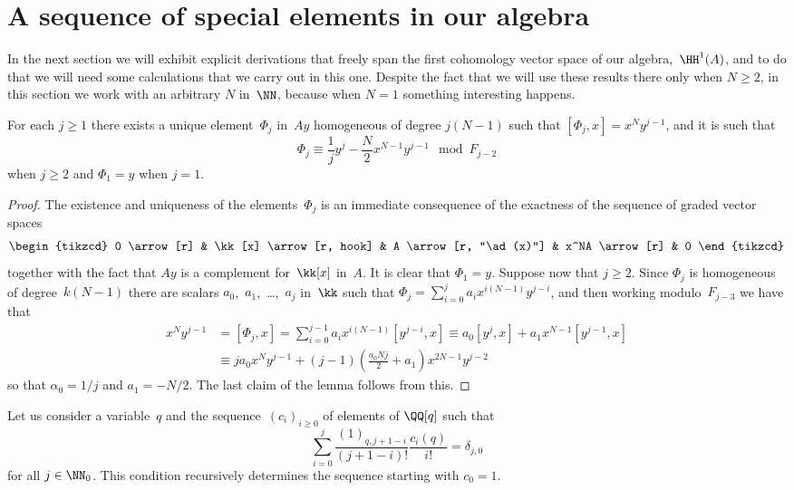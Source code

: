 \section{A sequence of special elements in our algebra}
\label{sect:phi}

In the next section we will exhibit explicit derivations that freely span
the first cohomology vector space of our algebra,~$\HH^1(A)$, and to do
that we will need some calculations that we carry out in this one.
Despite the fact that we will use these results there only when $N\geq2$,
in this section we work with an arbitrary $N$ in~$\NN$, because when $N=1$
something interesting happens.

\begin{Lemma}\label{lemma:phi}
For each $j\geq1$ there exists a unique element~$\Phi_j$ in~$Ay$
homogeneous of degree $j(N-1)$ such that $[\Phi_j,x]=x^Ny^{j-1}$, and it is
such that 
  \[
  \Phi_j\equiv\frac{1}{j}y^{j}-\frac{N}{2}x^{N-1}y^{j-1}\mod F_{j-2}
  \]
when $j\geq2$ and $\Phi_1=y$ when $j=1$.
\end{Lemma}

\begin{proof}
The existence and uniqueness of the elements~$\Phi_j$ is an immediate
consequence of the exactness of the sequence of graded vector spaces
  \[
  \begin{tikzcd}
  0 \arrow[r]
    & \kk[x] \arrow[r, hook]
    & A \arrow[r, "\ad(x)"]
    & x^NA \arrow[r]
    & 0
  \end{tikzcd}
  \]
together with the fact that $Ay$ is a complement for~$\kk[x]$ in~$A$. 
It is clear that $\Phi_1=y$. Suppose now that $j\geq2$.
Since $\Phi_j$ is homogeneous of degree~$k(N-1)$
there are scalars $a_0$,~$a_1$,~\dots,~$a_{j}$ in~$\kk$ such that
$\Phi_j=\sum_{i=0}^{j}a_ix^{i(N-1)}y^{j-i}$, and then working
modulo~$F_{j-3}$ we have that
  \begin{align}
  x^Ny^{j-1} 
       &= [\Phi_j,x]
        = \sum_{i=0}^{j-1}a_ix^{i(N-1)}[y^{j-i},x]
        \equiv a_0[y^j,x]+a_1x^{N-1}[y^{j-1},x] \\
       &\equiv ja_0x^Ny^{j-1} 
               +(j-1)\left(\frac{a_0Nj}{2}+a_1\right)x^{2N-1}y^{j-2}
  \end{align}
so that $\alpha_0=1/j$ and $a_1=-N/2$. The last claim of the lemma follows
from this.
\end{proof}

Let us consider a variable~$q$ and the sequence~$(c_i)_{i\geq0}$ of
elements of $\QQ[q]$ such that
  \[ \label{eq:ci}
  \sum_{i=0}^j\frac{(1)_{q,j+1-i}}{(j+1-i)!}  \frac{c_i(q)}{i!}
        = \delta_{j,0}
  \]
for all $j\in\NN_0$. This condition recursively determines the
sequence starting with $c_0=1$. 

